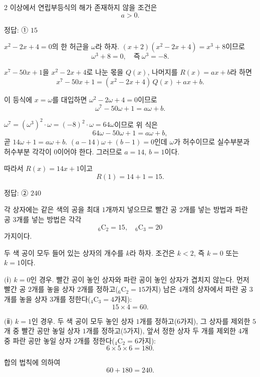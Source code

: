 \documentclass[10pt]{article}
\begin{document}
\begin{multicols}{2}
이상에서 연립부등식의 해가 존재하지 않을 조건은
\[ a > 0. \]

\begin{answerbox}정답: ① $15$\end{answerbox}

$x^2 - 2x + 4 = 0$의 한 허근을 $\omega$라 하자. $(x + 2)(x^2 - 2x + 4) = x^3 + 8$이므로
\[ \omega^3 + 8 = 0,\quad \text{즉}\ \omega^3 = -8. \]

$x^7 - 50x + 1$을 $x^2 - 2x + 4$로 나눈 몫을 $Q(x)$, 나머지를 $R(x) = ax + b$라 하면
\[ x^7 - 50x + 1 = (x^2 - 2x + 4)\,Q(x) + ax + b. \]

이 등식에 $x = \omega$를 대입하면 $\omega^2 - 2\omega + 4 = 0$이므로
\[ \omega^7 - 50\omega + 1 = a\omega + b. \]

$\omega^7 = (\omega^3)^2 \cdot \omega = (-8)^2 \cdot \omega = 64\omega$이므로 위 식은
\[ 64\omega - 50\omega + 1 = a\omega + b, \]
곧 $14\omega + 1 = a\omega + b$. $(a - 14)\omega + (b - 1) = 0$인데 $\omega$가 허수이므로 실수부분과 허수부분 각각이 $0$이어야 한다. 그러므로 $a = 14$, $b = 1$이다.

따라서 $R(x) = 14x + 1$이고
\[ R(1) = 14 + 1 = 15. \]

\begin{answerbox}정답: ② $240$\end{answerbox}

각 상자에는 같은 색의 공을 최대 $1$개까지 넣으므로 빨간 공 $2$개를 넣는 방법과 파란 공 $3$개를 넣는 방법은 각각
\[ {}_6\mathrm{C}_2 = 15,\quad {}_6\mathrm{C}_3 = 20 \]
가지이다.

두 색 공이 모두 들어 있는 상자의 개수를 $k$라 하자. 조건은 $k < 2$, 즉 $k = 0$ 또는 $k = 1$이다.

$(\!$ⅰ$)$ $k = 0$인 경우. 빨간 공이 놓인 상자와 파란 공이 놓인 상자가 겹치지 않는다. 먼저 빨간 공 $2$개를 놓을 상자 $2$개를 정하고(${}_6\mathrm{C}_2 = 15$가지) 남은 $4$개의 상자에서 파란 공 $3$개를 놓을 상자 $3$개를 정한다(${}_4\mathrm{C}_3 = 4$가지):
\[ 15 \times 4 = 60. \]

$(\!$ⅱ$)$ $k = 1$인 경우. 두 색 공이 모두 놓인 상자 $1$개를 정하고($6$가지), 그 상자를 제외한 $5$개 중 빨간 공만 놓일 상자 $1$개를 정하고($5$가지), 앞서 정한 상자 두 개를 제외한 $4$개 중 파란 공만 놓일 상자 $2$개를 정한다(${}_4\mathrm{C}_2 = 6$가지):
\[ 6 \times 5 \times 6 = 180. \]

합의 법칙에 의하여
\[ 60 + 180 = 240. \]


\end{multicols}
\end{document}
